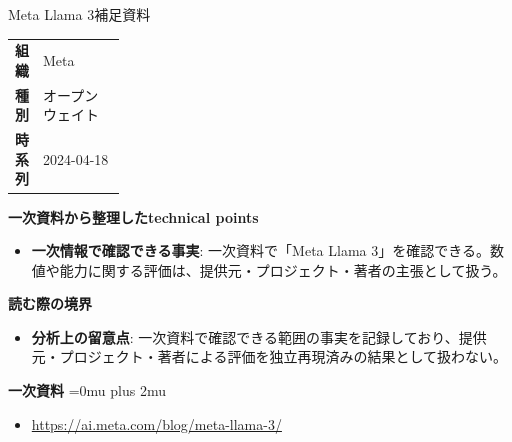 \begin{technicalnote}{Meta Llama 3}{補足資料}
\begingroup
\begin{tabularx}{\linewidth}{@{}>{\bfseries}p{0.22\linewidth}X@{}}
組織 & Meta \\
種別 & オープンウェイト \\
時系列 & 2024-04-18 \\
\end{tabularx}
\smallskip
{\bfseries 一次資料から整理したtechnical points}
\begin{itemize}[leftmargin=1.5em,itemsep=0.35em]
\item \textbf{一次情報で確認できる事実}: 一次資料で「Meta Llama 3」を確認できる。数値や能力に関する評価は、提供元・プロジェクト・著者の主張として扱う。
\end{itemize}
\begin{minipage}{\linewidth}
{\bfseries 読む際の境界}
\begin{itemize}[leftmargin=1.5em,itemsep=0.35em]
\item \textbf{分析上の留意点}: 一次資料で確認できる範囲の事実を記録しており、提供元・プロジェクト・著者による評価を独立再現済みの結果として扱わない。
\end{itemize}
\begin{samepage}
{\bfseries 一次資料}
\begingroup\sloppy
\Urlmuskip=0mu plus 2mu\relax
\begin{itemize}[leftmargin=1.5em,itemsep=0.25em]
\item {\scriptsize\url{https://ai.meta.com/blog/meta-llama-3/}}
\end{itemize}
\endgroup
\end{samepage}
\end{minipage}
\endgroup
\end{technicalnote}
\medskip

